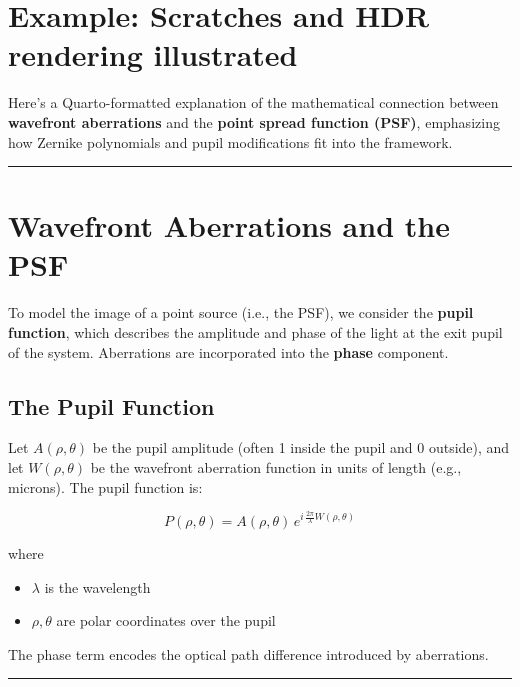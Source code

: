 \documentclass[
  letterpaper,
]{book}
\providecommand{\tightlist}{%
  \setlength{\itemsep}{0pt}\setlength{\parskip}{0pt}}\usepackage{longtable,booktabs,array}
\begin{document}
\section{Example: Scratches and HDR rendering
illustrated}\label{example-scratches-and-hdr-rendering-illustrated}

Here's a Quarto-formatted explanation of the mathematical connection
between \textbf{wavefront aberrations} and the \textbf{point spread
function (PSF)}, emphasizing how Zernike polynomials and pupil
modifications fit into the framework.

\begin{center}\rule{0.5\linewidth}{0.5pt}\end{center}

\section{Wavefront Aberrations and the
PSF}\label{sec-optics-psf-wavefront}

To model the image of a point source (i.e., the PSF), we consider the
\textbf{pupil function}, which describes the amplitude and phase of the
light at the exit pupil of the system. Aberrations are incorporated into
the \textbf{phase} component.

\subsection{The Pupil Function}\label{the-pupil-function}

Let \(A(\rho, \theta)\) be the pupil amplitude (often 1 inside the pupil
and 0 outside), and let \(W(\rho, \theta)\) be the wavefront aberration
function in units of length (e.g., microns). The pupil function is:

\[
P(\rho, \theta) = A(\rho, \theta) \, e^{i \, \frac{2\pi}{\lambda} W(\rho, \theta)}
\]

where

\begin{itemize}
\tightlist
\item
  \(\lambda\) is the wavelength
\item
  \(\rho, \theta\) are polar coordinates over the pupil
\end{itemize}

The phase term encodes the optical path difference introduced by
aberrations.

\begin{center}\rule{0.5\linewidth}{0.5pt}\end{center}
\end{document}
